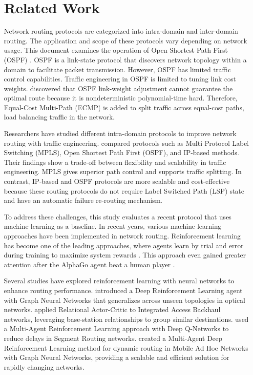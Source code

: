 \section{Related Work} 
Network routing protocols are categorized into intra-domain and inter-domain routing. The application and scope of these protocols vary depending on network usage. This document examines the operation of Open Shortest Path First (OSPF) \citep{rfc2328}. OSPF is a link-state protocol that discovers network topology within a domain to facilitate packet transmission. However, OSPF has limited traffic control capabilities. Traffic engineering in OSPF is limited to tuning link cost weights. \citet{832225} discovered that OSPF link-weight adjustment cannot guarantee the optimal route because it is nondeterministic polynomial-time hard. Therefore, Equal-Cost Multi-Path (ECMP) is added to split traffic across equal-cost paths, load balancing traffic in the network. 

Researchers have studied different intra-domain protocols to improve network routing with traffic engineering.  \citet{article} compared protocols such as Multi Protocol Label Switching (MPLS), Open Shortest Path First (OSPF), and IP-based methods. Their findings show a trade-off between flexibility and scalability in traffic engineering. MPLS gives superior path control and supports traffic splitting. In contrast, IP-based and OSPF protocols are more scalable and cost-effective because these routing protocols do not require Label Switched Path (LSP) state and have an automatic failure re-routing mechanism.

To address these challenges, this study evaluates a recent protocol that uses machine learning as a baseline. In recent years, various machine learning approaches have been implemented in network routing. Reinforcement learning has become one of the leading approaches, where agents learn by trial and error during training to maximize system rewards \citep{SHAKARAMI2020107496, sutton_reinforcement_2018}. This approach even gained greater attention after the AlphaGo agent beat a human player \citep{shaheen2026reinforcementlearningstrategybasedatari}.

Several studies have explored reinforcement learning with neural networks to enhance routing performance. \citet{ALMASAN2022184} introduced a Deep Reinforcement Learning agent with Graph Neural Networks that generalizes across unseen topologies in optical networks.\citet{Yamin2024} applied Relational Actor-Critic to Integrated Access Backhaul networks, leveraging base-station relationships to group similar destinations. \citet{10225785} used a Multi-Agent Reinforcement Learning approach with Deep Q-Networks to reduce delays in Segment Routing networks. \citet{11134361} created a Multi-Agent Deep Reinforcement Learning method for dynamic routing in Mobile Ad Hoc Networks with Graph Neural Networks, providing a scalable and efficient solution for rapidly changing networks.

